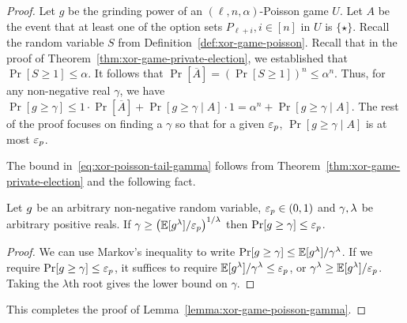   \begin{proof}
      Let $g$ be the grinding power of an $(\ell, n, \alpha)$-Poisson game $U$.
      Let $A$ be the event that 
      at least one of the option sets $P_{\ell + i}, i \in [n]$ in $U$ is $\{\star\}$. 
      Recall the random variable $S$ from Definition~\ref{def:xor-game-poisson}. 
      Recall that in the proof of Theorem~\ref{thm:xor-game-private-election}, 
      we established that $\Pr[S \geq 1] \leq \alpha$. 
      It follows that $\Pr[\overline{A}] = (\Pr[S \geq 1])^n \leq \alpha^n$. 
      Thus, for any non-negative real $\gamma$, 
      we have 
      $
      \Pr[g \geq \gamma] 
      \leq 1 \cdot \Pr[\overline{A}] + \Pr[g \geq \gamma \mid A] \cdot 1
      = \alpha^n + \Pr[g \geq \gamma \mid A]
      $. 
      The rest of the proof focuses on finding a $\gamma$ so that 
      for a given $\mathsf{\varepsilon}_p$, 
      $\Pr[g \geq \gamma \mid A]$ is at most $\mathsf{\varepsilon}_p$. 

      The bound in~\eqref{eq:xor-poisson-tail-gamma} follows from 
      Theorem~\ref{thm:xor-game-private-election} and the following fact.

      \begin{fact}\label{fact:grinding-max}\label{fact:tail-bound-from-moment-bound}
          Let $g$ be an arbitrary non-negative random variable, 
          $\mathsf{\varepsilon}_p \in (0, 1)$ and 
          $\gamma, \lambda$ be arbitrary positive reals. 
          If $
              \gamma \geq \left( \operatorname{\mathbb{E}}[g^\lambda]/\mathsf{\varepsilon}_p \right)^{1/\lambda}
          $
          then $\Pr[g \geq \gamma] \leq \mathsf{\varepsilon}_p$.    
      \end{fact}
      \begin{proof}
          We can use Markov's inequality to write 
          $
              \Pr[g \geq \gamma] \leq \operatorname{\mathbb{E}}[g^\lambda]/\gamma^\lambda
          $.
          If we require $\Pr[g \geq \gamma] \leq \mathsf{\varepsilon}_p$, 
          it suffices to require 
          $\operatorname{\mathbb{E}}[g^\lambda]/\gamma^\lambda \leq \mathsf{\varepsilon}_p$, or
          $\gamma^\lambda \geq \operatorname{\mathbb{E}}[g^\lambda]/\mathsf{\varepsilon}_p$. 
          Taking the $\lambda$th root gives the lower bound on $\gamma$.
      \end{proof}
      \noindent

      This completes the proof of Lemma~\ref{lemma:xor-game-poisson-gamma}.
  \end{proof}



